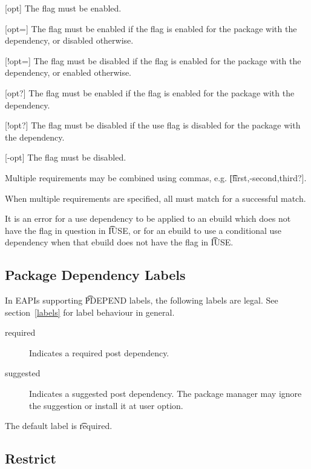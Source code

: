 \begin{description}
\item{[opt]} The flag must be enabled.
\item{[opt=]} The flag must be enabled if the flag is enabled for the package with the
    dependency, or disabled otherwise.
\item{[!opt=]} The flag must be disabled if the flag is enabled for the package with the
    dependency, or enabled otherwise.
\item{[opt?]} The flag must be enabled if the flag is enabled for the package with the
    dependency.
\item{[!opt?]} The flag must be disabled if the use flag is disabled for the package with the
    dependency.
\item{[-opt]} The flag must be disabled.
\end{description}

Multiple requirements may be combined using commas, e.g. \t{[first,-second,third?]}.

When multiple requirements are specified, all must match for a successful match.

It is an error for a use dependency to be applied to an ebuild which does not have the flag in
question in \t{IUSE}, or for an ebuild to use a conditional use dependency when that ebuild does
not have the flag in \t{IUSE}.

\IFKDEBUILDELSE
{
    \subsection{Package Dependency Labels}

    In EAPIs supporting \t{PDEPEND} labels, the following labels are legal. See
    section~\ref{labels} for label behaviour in general.

    \begin{description}
    \item[required] Indicates a required post dependency.
    \item[suggested] Indicates a suggested post dependency. The package manager may ignore the
        suggestion or install it at user option.
    \end{description}

    The default label is \t{required}.
}{
}

\subsection{Restrict}
\label{restrict}

